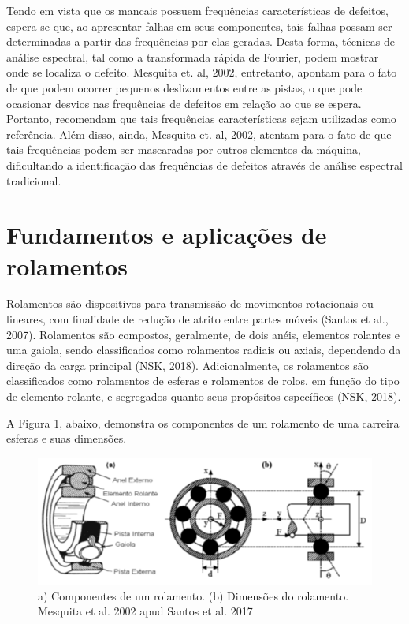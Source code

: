 \documentclass[
	12pt,				
	oneside,			
	a4paper,			
	english,			
	brazil				
	]{abntex2ppgsi}
\begin{document}
Tendo em vista que os mancais possuem frequências características de defeitos, espera-se que, ao apresentar falhas em seus componentes, tais falhas possam ser determinadas a partir das frequências por elas geradas. Desta forma, técnicas de análise espectral, tal como a transformada rápida de Fourier, podem mostrar onde se localiza o defeito. Mesquita et. al, 2002, entretanto, apontam para o fato de que podem ocorrer pequenos deslizamentos entre as pistas, o que pode ocasionar desvios nas frequências de defeitos em relação ao que se espera. Portanto, recomendam que tais frequências características sejam utilizadas como referência. Além disso, ainda, Mesquita et. al, 2002, atentam para o fato de que tais frequências podem ser mascaradas por outros elementos da máquina, dificultando a identificação das frequências de defeitos através de análise espectral tradicional.


\section{\textbf{Fundamentos e aplicações de rolamentos}}
Rolamentos são dispositivos para transmissão de movimentos rotacionais ou lineares, com finalidade de redução de atrito entre partes móveis (Santos et al., 2007). Rolamentos são compostos, geralmente, de dois anéis, elementos rolantes e uma gaiola, sendo classificados como rolamentos radiais ou axiais, dependendo da direção da carga principal (NSK, 2018). Adicionalmente, os rolamentos são classificados como rolamentos de esferas e rolamentos de rolos, em função do tipo de elemento rolante, e segregados quanto seus propósitos específicos (NSK, 2018).

A Figura 1, abaixo, demonstra os componentes de um rolamento de uma carreira esferas e suas dimensões. 

\begin{figure}[!htb]
\centering
\includegraphics{Figura1}
\caption{a) Componentes de um rolamento. (b) Dimensões do rolamento. Mesquita et al. 2002 apud Santos et al. 2017}
\label{Figura1}
\end{figure}
\end{document}
